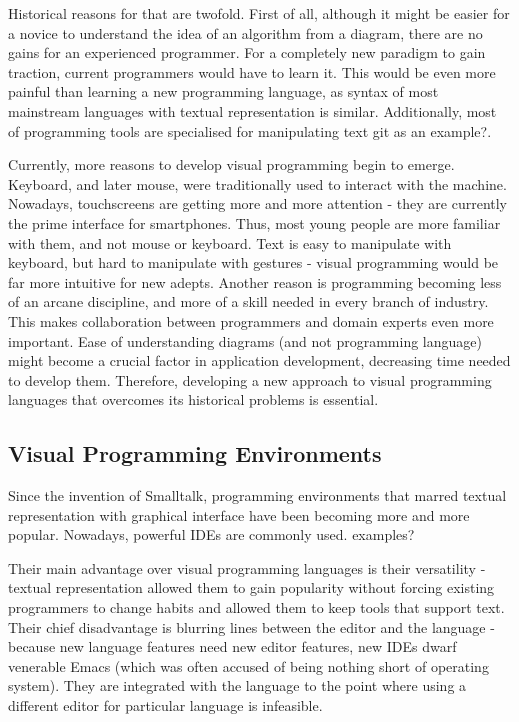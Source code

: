 \documentclass[11pt]{scrartcl}
\begin{document}
Historical reasons for that are twofold. First of all, although it might be easier for a novice to understand the idea of an algorithm from a diagram, there are no gains for an experienced programmer. For a completely new paradigm to gain traction, current programmers would have to learn it. This would be even more painful than learning a new programming language, as syntax of most mainstream languages with textual representation is similar. Additionally, most of programming tools are specialised for manipulating text {git as an example?}.

Currently, more reasons to develop visual programming begin to emerge. Keyboard, and later mouse, were traditionally used to interact with the machine. Nowadays, touchscreens are getting more and more attention - they are currently the prime interface for smartphones. Thus, most young people are more familiar with them, and not mouse or keyboard. Text is easy to manipulate with keyboard, but hard to manipulate with gestures - visual programming would be far more intuitive for new adepts. Another reason is programming becoming less of an arcane discipline, and more of a skill needed in every branch of industry. This makes collaboration between programmers and domain experts even more important. Ease of understanding diagrams (and not programming language) might become a crucial factor in application development, decreasing time needed to develop them. Therefore, developing a new approach to visual programming languages that overcomes its historical problems is essential.

\subsection{Visual Programming Environments}
Since the invention of Smalltalk, programming environments that marred textual representation with graphical interface have been becoming more and more popular. Nowadays, powerful IDEs are commonly used. {examples?}

Their main advantage over visual programming languages is their versatility - textual representation allowed them to gain popularity without forcing existing programmers to change habits and allowed them to keep tools that support text. Their chief disadvantage is blurring lines between the editor and the language - because new language features need new editor features, new IDEs dwarf venerable Emacs (which was often accused of being nothing short of operating system). They are integrated with the language to the point where using a different editor for particular language is infeasible.
\end{document}
